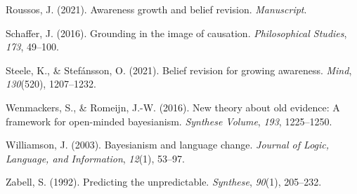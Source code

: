 \documentclass[
  11pt,
  dvipsnames,enabledeprecatedfontcommands, todos]{scrartcl}
\newlength{\cslhangindent}
\newlength{\cslentryspacingunit} %
\newenvironment{CSLReferences}[2] %
 {%
  \setlength{\parindent}{0pt}
  \ifodd #1
  \let\oldpar\par
  \def\par{\hangindent=\cslhangindent\oldpar}
  \fi
  \setlength{\parskip}{#2\cslentryspacingunit}
 }%
 {}
\begin{document}
\begin{CSLReferences}{1}{0}
\leavevmode{}%
Roussos, J. (2021). Awareness growth and belief revision.
\emph{Manuscript}.

\leavevmode{}%
Schaffer, J. (2016). Grounding in the image of causation.
\emph{Philosophical Studies}, \emph{173}, 49--100.

\leavevmode{}%
Steele, K., \& Stefánsson, O. (2021). Belief revision for growing
awareness. \emph{Mind}, \emph{130}(520), 1207--1232.

\leavevmode{}%
Wenmackers, S., \& Romeijn, J.-W. (2016). New theory about old evidence:
A framework for open-minded bayesianism. \emph{Synthese Volume},
\emph{193}, 1225--1250.

\leavevmode{}%
Williamson, J. (2003). Bayesianism and language change. \emph{Journal of
Logic, Language, and Information}, \emph{12}(1), 53--97.

\leavevmode{}%
Zabell, S. (1992). Predicting the unpredictable. \emph{Synthese},
\emph{90}(1), 205--232.

\end{CSLReferences}
\end{document}
